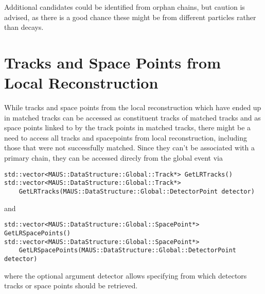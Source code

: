 Additional candidates could be identified from orphan chains, but caution is advised, as there is a good chance these might be from different particles rather than decays.

\section{Tracks and Space Points from Local Reconstruction}\label{sec:lr_tracks_spacepoints}

While tracks and space points from the local reconstruction which have ended up in matched tracks can be accessed as constituent tracks of matched tracks and
as space points linked to by the track points in matched tracks, there might be a need to access all tracks and spacepoints from local reconstruction,
including those that were not successfully matched. Since they can't be associated with a primary chain, they can be accessed direcly from the global event via
\begin{verbatim}
std::vector<MAUS::DataStructure::Global::Track*> GetLRTracks()
std::vector<MAUS::DataStructure::Global::Track*>
    GetLRTracks(MAUS::DataStructure::Global::DetectorPoint detector)
\end{verbatim}
and
\begin{verbatim}
std::vector<MAUS::DataStructure::Global::SpacePoint*> GetLRSpacePoints()
std::vector<MAUS::DataStructure::Global::SpacePoint*>
    GetLRSpacePoints(MAUS::DataStructure::Global::DetectorPoint detector)
\end{verbatim}
where the optional argument detector allows specifying from which detectors tracks or space points should be retrieved.
